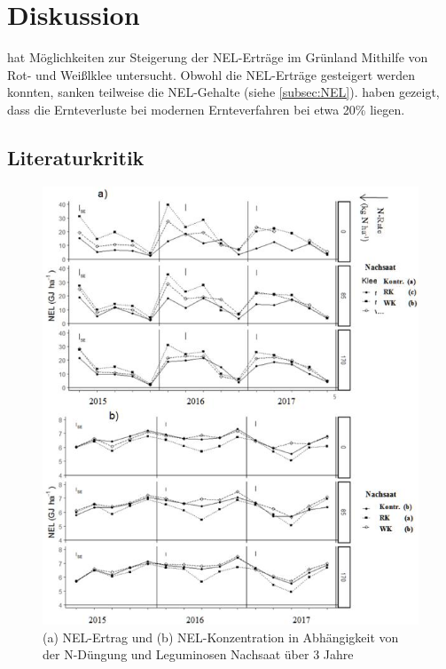 
\section{Diskussion}
\label{sec:Disukussion}
\textcite[33-36]{weggler2050leguminosen} hat Möglichkeiten zur Steigerung der \ac{NEL}-Erträge im Grünland Mithilfe von Rot- und Weißlklee untersucht.
Obwohl die \ac{NEL}-Erträge gesteigert werden konnten, sanken teilweise die \ac{NEL}-Gehalte (siehe \cref{subsec:NEL}).
\textcite{fritz2018wirtschaftliche} haben gezeigt, dass die Ernteverluste bei modernen Ernteverfahren bei etwa 20\% liegen.


\subsection{Literaturkritik}
\label{sub:kritik}

\begin{figure}
	\includegraphics[scale=0.75]{images/wegglerAbb1}
	\caption[(a) \acs{NEL}-Ertrag und (b) \acs{NEL}-Konzentration in Abhängigkeit von der N-Düngung und Leguminosen Nachsaat über 3 Jahre]{(a) \ac{NEL}-Ertrag und (b) \ac{NEL}-Konzentration in Abhängigkeit von der N-Düngung und Leguminosen Nachsaat über 3 Jahre \parencite[35]{weggler2050leguminosen}}
	\label{fig:wegglerAbb1}
\end{figure}



